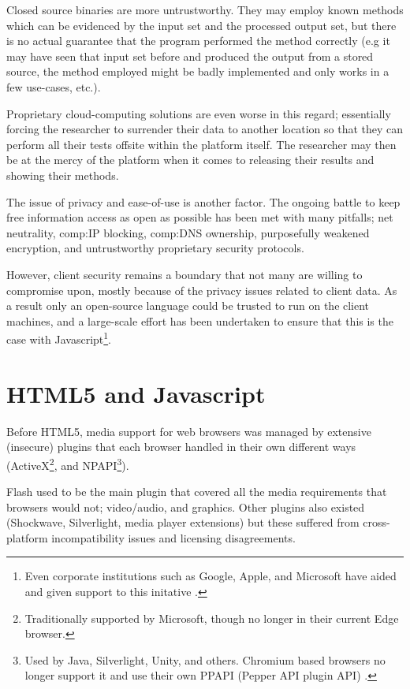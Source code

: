 Closed source binaries are more untrustworthy. They may employ known methods which can be evidenced by the input set and the processed output set, but there is no actual guarantee that the program performed the method correctly (e.g it may have seen that input set before and produced the output from a stored source, the method employed might be badly implemented and only works in a few use-cases, etc.).

Proprietary cloud-computing solutions are even worse in this regard; essentially forcing the researcher to surrender their data to another location so that they can perform all their tests offsite within the platform itself. The researcher may then be at the mercy of the platform when it comes to releasing their results and showing their methods.

The issue of privacy and ease-of-use is another factor. The ongoing battle to keep free information access as open as possible has been met with many pitfalls; net neutrality, \gls{comp:IP} blocking, \gls{comp:DNS} ownership, purposefully weakened encryption, and untrustworthy proprietary security protocols. 

However, client security remains a boundary that not many are willing to compromise upon, mostly because of the privacy issues related to client data. As a result only an open-source language could be trusted to run on the client machines, and a large-scale effort has been undertaken to ensure that this is the case with Javascript\footnote{Even corporate institutions such as Google, Apple, and Microsoft have aided and given support to this initative \cite{o2004open}.}.


\section{HTML5 and Javascript}

Before HTML5, media support for web browsers was managed by extensive (insecure) plugins that each browser handled in their own different ways (ActiveX\footnote{Traditionally supported by Microsoft, though no longer in their current Edge browser.}, and NPAPI\footnote{Used by Java, Silverlight, Unity, and others. Chromium based browsers no longer support it and use their own PPAPI (Pepper API plugin API) \cite{eriksson2012migrating}.}).

Flash used to be the main plugin that covered all the media requirements that browsers would not; video/audio, and graphics. Other plugins also existed (Shockwave, Silverlight, media player extensions) but these suffered from cross-platform incompatibility issues and licensing disagreements.

